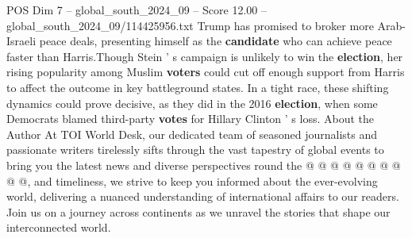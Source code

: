 \begin{textsample}{POS Dim 7 – global\_south\_2024\_09 – Score 12.00 – global\_south\_2024\_09/114425956.txt}
Trump has promised to broker more Arab-Israeli peace deals, presenting himself as the \textbf{candidate} who can achieve peace faster than Harris.Though Stein ' s campaign is unlikely to win the \textbf{election}, her rising popularity among Muslim \textbf{voters} could cut off enough support from Harris to affect the outcome in key battleground states.
In a tight race, these shifting dynamics could prove decisive, as they did in the 2016 \textbf{election}, when some Democrats blamed third-party \textbf{votes} for Hillary Clinton ' s loss.
About the Author At TOI World Desk, our dedicated team of seasoned journalists and passionate writers tirelessly sifts through the vast tapestry of global events to bring you the latest news and diverse perspectives round the @ @ @ @ @ @ @ @ @ @, and timeliness, we strive to keep you informed about the ever-evolving world, delivering a nuanced understanding of international affairs to our readers.
Join us on a journey across continents as we unravel the stories that shape our interconnected world.

\end{textsample}
